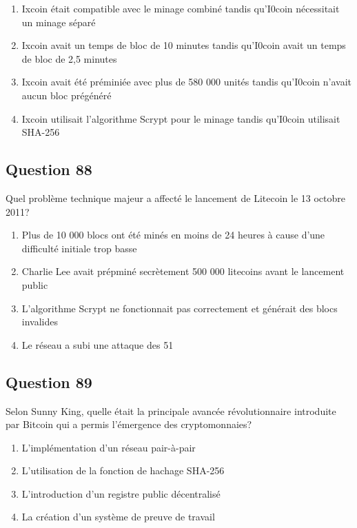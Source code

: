 \documentclass[12pt,a4paper]{article}
\begin{document}
\begin{enumerate}[label=\Alph*., leftmargin=*]
\item Ixcoin était compatible avec le minage combiné tandis qu'I0coin nécessitait un minage séparé
\item Ixcoin avait un temps de bloc de 10 minutes tandis qu'I0coin avait un temps de bloc de 2,5 minutes
\item Ixcoin avait été préminiée avec plus de 580 000 unités tandis qu'I0coin n'avait aucun bloc prégénéré
\item Ixcoin utilisait l'algorithme Scrypt pour le minage tandis qu'I0coin utilisait SHA-256
\end{enumerate}

\bigskip


\subsection*{Question 88}
Quel problème technique majeur a affecté le lancement de Litecoin le 13 octobre 2011?

\begin{enumerate}[label=\Alph*., leftmargin=*]
\item Plus de 10 000 blocs ont été minés en moins de 24 heures à cause d'une difficulté initiale trop basse
\item Charlie Lee avait prépminé secrètement 500 000 litecoins avant le lancement public
\item L'algorithme Scrypt ne fonctionnait pas correctement et générait des blocs invalides
\item Le réseau a subi une attaque des 51%
\end{enumerate}

\bigskip


\subsection*{Question 89}
Selon Sunny King, quelle était la principale avancée révolutionnaire introduite par Bitcoin qui a permis l'émergence des cryptomonnaies?

\begin{enumerate}[label=\Alph*., leftmargin=*]
\item L'implémentation d'un réseau pair-à-pair
\item L'utilisation de la fonction de hachage SHA-256
\item L'introduction d'un registre public décentralisé
\item La création d'un système de preuve de travail
\end{enumerate}
\end{document}
